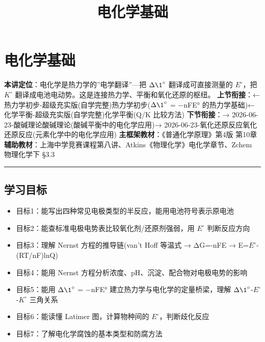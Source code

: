 \documentclass[a4paper,11pt]{ctexart}
\title{电化学基础}
\date{}
\providecommand{\tightlist}{\setlength{\itemsep}{0pt}\setlength{\parskip}{0pt}}
\begin{document}
\maketitle
\tableofcontents
\newpage
\section{电化学基础}\label{ux7535ux5316ux5b66ux57faux7840}

\textbf{本讲定位}：电化学是热力学的''电学翻译''---把 \(\Delta \1^{\circ}\) 翻译成可直接测量的 \(E^{\circ}\)，把 \(K^{\circ}\) 翻译成电池电动势。这是连接热力学、平衡和氧化还原的枢纽。
\textbf{上节衔接}：← 热力学初步-超级充实版(自学完整)\textbar 热力学初步(\(\Delta \1^{\circ}\) = −nFE° 的热力学基础)← 化学平衡-超级充实版(自学完整)\textbar 化学平衡(Q/K 比较方法)
\textbf{下节衔接}：→ 2026-06-23-酸碱理论\textbar 酸碱理论(酸碱平衡中的电化学应用)→ 2026-06-23-氧化还原反应\textbar 氧化还原反应(元素化学中的电化学应用)
\textbf{主框架教材}：《普通化学原理》第4版 第10章
\textbf{辅助教材}：上海中学竞赛课程第八讲、Atkins《物理化学》电化学章节、Zchem 物理化学下 §3.3

\begin{center}\rule{0.5\linewidth}{0.5pt}\end{center}

\subsection{学习目标}\label{ux5b66ux4e60ux76eeux6807}

\begin{itemize}
\tightlist
\item
  目标1：能写出四种常见电极类型的半反应，能用电池符号表示原电池
\item
  目标2：能查标准电极电势表比较氧化剂/还原剂强弱，用 \(E^{\circ}\) 判断反应方向
\item
  目标3：理解 Nernst 方程的推导链(van't Hoff 等温式 → ΔG=-nFE → E=\(E^{\circ}\)-(RT/nF)lnQ)
\item
  目标4：能用 Nernst 方程分析浓度、pH、沉淀、配合物对电极电势的影响
\item
  目标5：能用 \(\Delta \1^{\circ}\) = −nFE° 建立热力学与电化学的定量桥梁，理解 \(\Delta \1^{\circ}\)-\(E^{\circ}\)-\(K^{\circ}\) 三角关系
\item
  目标6：能读懂 Latimer 图，计算物种间的 \(E^{\circ}\)，判断歧化反应
\item
  目标7：了解电化学腐蚀的基本类型和防腐方法
\end{itemize}
\end{document}
